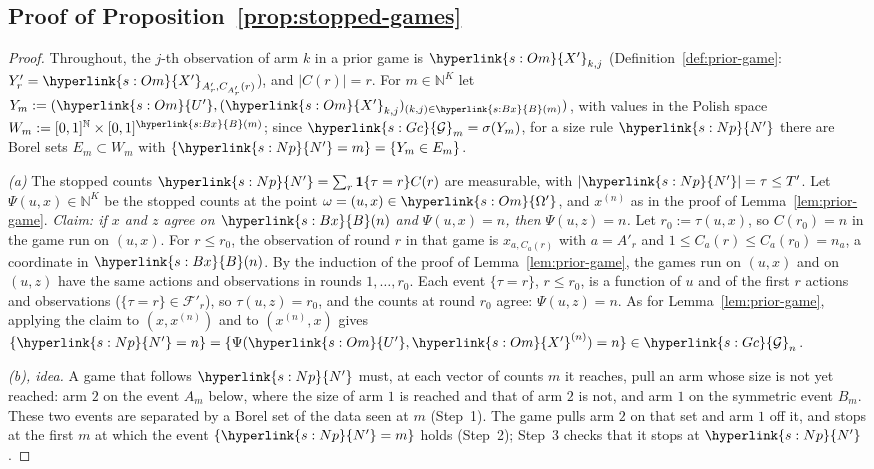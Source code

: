 \documentclass[11pt]{article}
\newcommand{\sy}[2]{\hyperlink{#1}{#2}}
\newcommand{\N}{\mathbb{N}}
\newcommand{\ind}{\mathbf{1}}
\newcommand{\Gc}{\sy{s:Gc}{\mathcal{G}}}
\newcommand{\Bx}{\sy{s:Bx}{B}}
\newcommand{\Np}{\sy{s:Np}{N'}}
\newcommand{\Om}{\sy{s:Om}{\Omega'}}
\newcommand{\Up}{\sy{s:Om}{U'}}
\newcommand{\Xp}{\sy{s:Om}{X'}}
\begin{document}
\subsection{Proof of Proposition~\ref{prop:stopped-games}}\label{sec:proof-stopped-games}

\begin{proof}
Throughout, the $j$-th observation of arm $k$ in a prior game is $\Xp_{k,j}$
(Definition~\ref{def:prior-game}: $Y'_r=\Xp_{A'_r,C_{A'_r}(r)}$), and $|C(r)|=r$. For
$m\in\N^K$ let $Y_m:=(\Up,(\Xp_{k,j})_{(k,j)\in\Bx(m)})$, with values in the Polish space
$W_m:=[0,1]^{\N}\times[0,1]^{\Bx(m)}$; since $\Gc_m=\sigma(Y_m)$, for a size rule $\Np$ there are
Borel sets $E_m\subset W_m$ with $\{\Np=m\}=\{Y_m\in E_m\}$.

\emph{(a)} The stopped counts $\Np=\sum_r\ind\{\tau=r\}C(r)$ are measurable, with $|\Np|=\tau\le T'$.
Let $\Psi(u,x)\in\N^K$ be the stopped counts at the point $\omega=(u,x)\in\Om$, and $x^{(n)}$ as
in the proof of Lemma~\ref{lem:prior-game}. \emph{Claim: if $x$ and $z$ agree on $\Bx(n)$ and
$\Psi(u,x)=n$, then $\Psi(u,z)=n$.} Let $r_0:=\tau(u,x)$, so $C(r_0)=n$ in the game run on $(u,x)$.
For $r\le r_0$, the observation of round $r$ in that game is $x_{a,C_a(r)}$ with $a=A'_r$ and
$1\le C_a(r)\le C_a(r_0)=n_a$, a coordinate in $\Bx(n)$. By the induction of the proof of
Lemma~\ref{lem:prior-game}, the games run on $(u,x)$ and on $(u,z)$ have the same actions and
observations in rounds $1,\dots,r_0$. Each event $\{\tau=r\}$, $r\le r_0$, is a function of $u$
and of the first $r$ actions and observations ($\{\tau=r\}\in\mathcal F'_r$), so $\tau(u,z)=r_0$,
and the counts at round $r_0$ agree: $\Psi(u,z)=n$. As for Lemma~\ref{lem:prior-game}, applying
the claim to $(x,x^{(n)})$ and to $(x^{(n)},x)$ gives $\{\Np=n\}=\{\Psi(\Up,\Xp^{(n)})=n\}\in\Gc_n$.

\emph{(b), idea.} A game that follows $\Np$ must, at each vector of counts $m$ it reaches, pull an
arm whose size is not yet reached: arm $2$ on the event $A_m$ below, where the size of arm $1$ is
reached and that of arm $2$ is not, and arm $1$ on the symmetric event $B_m$. These two events are
separated by a Borel set of the data seen at $m$ (Step~1). The game pulls
arm $2$ on that set and arm $1$ off it, and stops at the first $m$ at which the event $\{\Np=m\}$
holds (Step~2); Step~3 checks that it stops at $\Np$.


\end{proof}
\end{document}
